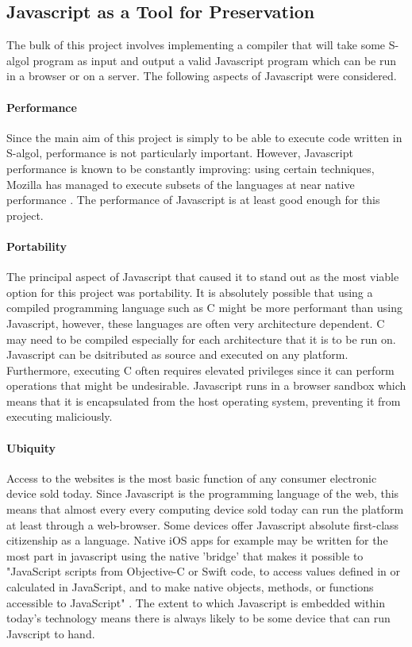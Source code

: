 \documentclass{article}
\begin{document}
\subsection{Javascript as a Tool for Preservation}

The bulk of this project involves implementing a compiler that will take some S-algol program as input and output a valid Javascript program which can be run in a browser or on a server. The following aspects of Javascript were considered.

\paragraph{Performance} Since the main aim of this project is simply to be able to execute code written in S-algol, performance is not particularly important. However, Javascript performance is known to be constantly improving: using certain techniques, Mozilla has managed to execute subsets of the languages at near native performance \cite{moz}. The performance of Javascript is at least good enough for this project. 

\paragraph{Portability} The principal aspect of Javascript that caused it to stand out as the most viable option for this project was portability. It is absolutely possible that using a compiled programming language such as C might be more performant than using Javascript, however, these languages are often very architecture dependent. C may need to be compiled especially for each architecture that it is to be run on. Javascript can be dsitributed as source and executed on any platform. Furthermore, executing C often requires elevated privileges since it can perform operations that might be undesirable. Javascript runs in a browser sandbox which means that it is encapsulated from the host operating system, preventing it from executing maliciously.

\paragraph{Ubiquity} Access to the websites is the most basic function of any consumer electronic device sold today. Since Javascript is the programming language of the web, this means that almost every every computing device sold today can run the platform at least through a web-browser. Some devices offer Javascript absolute first-class citizenship as a language. Native iOS apps for example may be written for the most part in javascript using the native 'bridge' that makes it possible to "JavaScript scripts from Objective-C or Swift code, to access values defined in or calculated in JavaScript, and to make native objects, methods, or functions accessible to JavaScript" \cite{apple}. The extent to which Javascript is embedded within today's technology means there is always likely to be some device that can run Javscript to hand.
\end{document}
